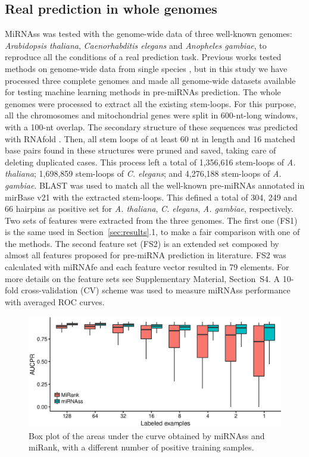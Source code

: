 \documentclass{article}
\begin{document}
\subsection{Real prediction in whole genomes} \label{sec:results:genome-wide}
MiRNAss was tested with the genome-wide data of three well-known genomes: \textit{Arabidopsis thaliana}, \textit{Caenorhabditis elegans} and \textit{Anopheles gambiae}, to reproduce all the conditions of a real prediction task. Previous works tested methods on genome-wide data from single species \citep{lai2003computational, bentwich2005identification, adai2005computational, huang2007mirfinder, billoud2014computational}, but in this study we have processed three complete genomes and made all genome-wide datasets available for testing machine learning methods in pre-miRNAs prediction.
The whole genomes were processed to extract all the existing stem-loops. For this purpose, all the chromosomes and mitochondrial genes were split in 600-nt-long windows, with a 100-nt overlap. The secondary structure of these sequences was predicted with RNAfold \citep{lorenz2011viennarna}. Then, all stem loops of at least 60 nt in length and 16 matched base pairs found in these structures were pruned and saved, taking care of deleting duplicated cases. 
This process left a total of 1,356,616 stem-loops of \textit{A. thaliana}; 1,698,859 stem-loops of \textit{C. elegans}; and 4,276,188 stem-loops of \textit{A. gambiae}. BLAST \citep{camacho2009blast+} was used to match all the well-known pre-miRNAs annotated in mirBase v21 with the extracted stem-loops. This defined a total of 304, 249 and 66 hairpins as positive set for \textit{A. thaliana}, \textit{C. elegans}, \textit{A. gambiae}, respectively.
Two sets of features were extracted from the three genomes. The first one (FS1) is the same used in Section~\ref{sec:results}.1, to make a fair comparison with one of the methods. The second feature set (FS2) is an extended set composed by almost all features proposed for pre-miRNA prediction in literature. FS2 was calculated with miRNAfe \citep{yones2015mirnafe} and each feature vector resulted in 79 elements. For more details on the feature sets see Supplementary Material, Section~S4. A 10-fold cross-validation (CV) scheme was used to measure miRNAss performance with averaged ROC curves.
\begin{figure}[tpb]
	\centering
	\includegraphics[width=0.6\linewidth]{few_samples_miRank.eps}
	\caption{Box plot of the areas under the curve obtained by miRNAss and miRank, with a different number of positive training samples.}
	\label{fig:miRank}
\end{figure}
\end{document}
